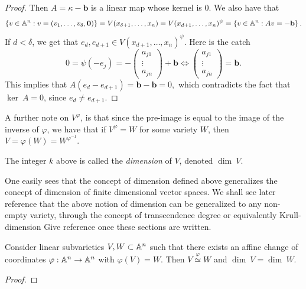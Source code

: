 \begin{proof}
    Then $A = \kappa-\mathbf{b}$ is a linear map whose kernel is $0$. We also have that 
    $$\{v\in\mathbb{A}^n : v= (v_1,\dots,v_\delta,\mathbf{0})\}=V(x_{\delta+1},\dots,x_{n})=V(x_{d+1},\dots,x_n)^\psi = \left\{v\in \mathbb{A}^n : Av=-\mathbf{b}\right\}.$$
    If $d<\delta$, we get that $e_d, e_{d+1} \in V(x_{d+1},\dots,x_n)^\psi$. Here is the catch 
    $$0=\psi(-e_j) = -\begin{pmatrix}
     a_{j1}\\ \vdots \\ a_{j n}   
    \end{pmatrix} + \mathbf{b} \iff \begin{pmatrix}
     a_{j1}\\ \vdots \\ a_{j n}   
    \end{pmatrix}= \mathbf{b}.$$
    This implies that $A(e_d-e_{d+1}) = \mathbf{b}-\mathbf{b}=0,$
    which contradicts the fact that $\ker\ A = 0$, since $e_d\neq e_{d+1}$.
\end{proof}
\begin{remark}\label{MayConsiderPreimageAsImage}
    A further note on $V^\varphi$, is that since the pre-image is equal to the image of the inverse of $\varphi$, we have that if $V^\varphi = W$ for some variety $W$, then $V = \varphi(W) = W^{\varphi^{-1}}$. 
\end{remark}
\begin{definition}\label{LinearSubvarDimension}
    The integer $k$ above is called the \textit{dimension} of $V$, denoted $\dim\ V$. 
\end{definition}
\begin{remark}
    One easily sees that the concept of dimension defined above generalizes the concept of dimension of finite dimensional vector spaces. We shall see later {\Large reference} that the above notion of dimension can be generalized to any non-empty variety, through the concept of transcendence degree or equivalently Krull-dimension {\Large Give reference once these sections are written}. 
\end{remark}
\begin{lemma}
    Consider linear subvarieties $V,W\subset \mathbb{A}^n$ such that there exists an affine change of coordinates $\varphi: \mathbb{A}^n \rightarrow \mathbb{A}^n$ with $\varphi(V)=W$. Then $V\overset{\varphi}{\simeq} W$ and $\dim\ V=\dim\ W$.
\end{lemma}
\begin{proof}
    
\end{proof}
